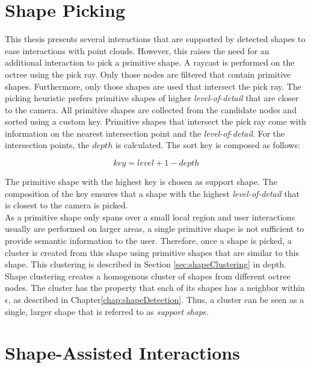 \section{Shape Picking}
\label{sec:shapePicking}

This thesis presents several interactions that are supported by detected shapes to ease interactions with point clouds.  
However, this raises the need for an additional interaction to pick a primitive shape. A raycast is performed on the octree using the pick ray. Only those nodes are filtered that contain primitive shapes. Furthermore, only those shapes are used that intersect the pick ray. The picking heuristic prefers primitive shapes of higher \textit{level-of-detail} that are closer to the camera. All primitive shapes are collected from the candidate nodes and sorted using a custom key. Primitive shapes that intersect the pick ray come with information on the nearest intersection point and the \textit{level-of-detail}. For the intersection points, the $depth$ is calculated. The sort key is composed as follows: 

$$key = level + 1 - depth$$

The primitive shape with the highest key is chosen as support shape. The composition of the key ensures that a shape with the highest \textit{level-of-detail} that is closest to the camera is picked.
\\
As a primitive shape only spans over a small local region and user interactions usually are performed on larger areas, a single primitive shape is not sufficient to provide semantic information to the user. Therefore, once a shape is picked, a cluster is created from this shape using primitive shapes that are similar to this shape. This clustering is described in Section \ref{sec:shapeClustering} in depth. Shape clustering creates a homogenous cluster of shapes from different octree nodes. The cluster has the property that each of its shapes has a neighbor within $\epsilon$,
 as described in Chapter\ref{chap:shapeDetection}. Thus, a cluster can be seen as a single, larger shape that is referred to as \textit{support shape}.


\section{Shape-Assisted Interactions}
\label{sec:interactions}

